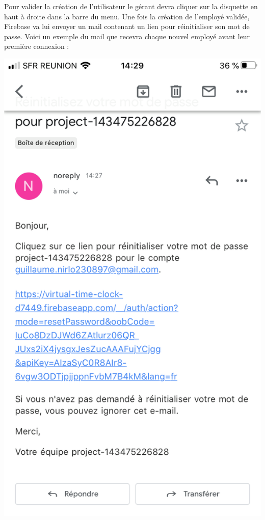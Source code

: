 \documentclass{article}
\begin{document}
Pour valider la création de l'utilisateur le gérant devra cliquer sur la disquette en haut à droite dans la barre du menu. 
Une fois la création de l'employé validée, Firebase va lui envoyer un mail contenant un lien pour réinitialiser son mot de passe.  Voici un exemple du mail que recevra chaque nouvel employé avant leur première connexion :
\begin{center}
    \includegraphics[scale=0.15]{mail.png}
\end{center}
\end{document}
